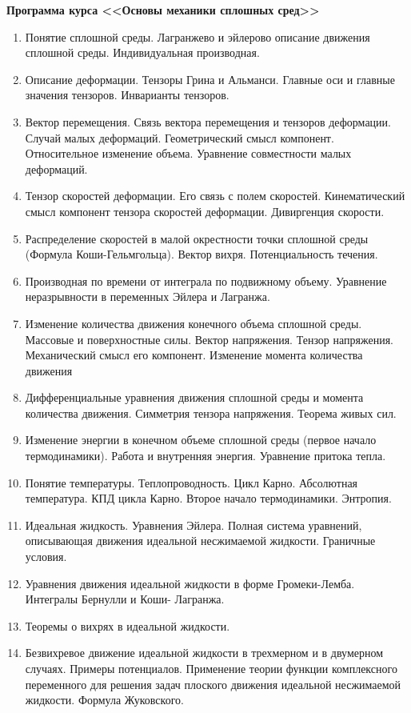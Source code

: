 \documentclass[specialist, subf, href, colorlinks=true, 14pt, times, mtpro, final]{report}
\theoremstyle{definition}
\begin{document}
	\centering
	{\bf Программа курса <<Основы механики сплошных сред>>}
	\begin{enumerate}
\item Понятие сплошной среды. Лагранжево и эйлерово описание движения сплошной среды. Индивидуальная производная.
\item Описание деформации. Тензоры Грина и Альманси. Главные оси и главные значения тензоров. Инварианты тензоров.
\item Вектор перемещения. Связь вектора перемещения и тензоров деформации. Случай малых деформаций. Геометрический смысл компонент. Относительное изменение объема. Уравнение совместности малых деформаций.
\item Тензор скоростей деформации. Его связь с полем скоростей. Кинематический смысл компонент тензора скоростей деформации. Дивиргенция скорости.
\item Распределение скоростей в малой окрестности точки сплошной среды (Формула Коши-Гельмгольца). Вектор вихря. Потенциальность течения.
\item Производная по времени от интеграла по подвижному объему. Уравнение неразрывности в переменных Эйлера и Лагранжа.
\item Изменение количества движения конечного объема сплошной среды. Массовые и поверхностные силы. Вектор напряжения. Тензор напряжения. Механический смысл его компонент. Изменение момента количества движения
\item Дифференциальные уравнения движения сплошной среды и момента количества движения. Симметрия тензора напряжения. Теорема живых сил.
\item Изменение энергии в конечном объеме сплошной среды (первое начало термодинамики). Работа и внутренняя энергия. Уравнение притока тепла.
\item Понятие температуры. Теплопроводность. Цикл Карно. Абсолютная температура. КПД цикла Карно. Второе начало термодинамики. Энтропия.
\item Идеальная жидкость. Уравнения Эйлера. Полная система уравнений, описывающая движения идеальной несжимаемой жидкости. Граничные условия.
\item Уравнения движения идеальной жидкости в форме Громеки-Лемба. Интегралы Бернулли и Коши- Лагранжа.
\item Теоремы о вихрях в идеальной жидкости.
\item Безвихревое движение идеальной жидкости в трехмерном и в двумерном случаях. Примеры потенциалов. Применение теории функции комплексного переменного для решения задач плоского движения идеальной несжимаемой жидкости. Формула Жуковского.

\end{enumerate}
\end{document}
